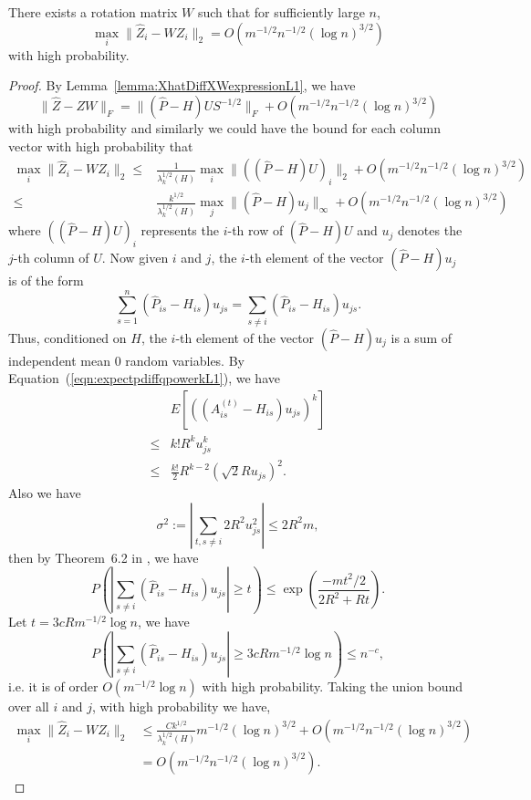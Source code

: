 \begin{theorem}
\label{thm:XhatDiffXWL1}
There exists a rotation matrix $W$ such that for sufficiently large $n$,
\[
	\max_i \| \hat{Z}_i - W Z_i \|_2 = O(m^{-1/2} n^{-1/2} (\log n)^{3/2})
\]
with high probability.
\end{theorem}
\begin{proof}
By Lemma~\ref{lemma:XhatDiffXWexpressionL1}, we have
\[
	\|\hat{Z} - Z W\|_F = \| (\hat{P} - H) U S^{-1/2} \|_F + O(m^{-1/2} n^{-1/2} (\log n)^{3/2})
\]
 with high probability and similarly we could have the bound for each column vector with high probability that
\begin{align*}
	\max_i \| \hat{Z}_i - W Z_i \|_2
    \le & \frac{1}{\lambda_k^{1/2}(H)} \max_i \| ((\hat{P} - H) U)_i \|_2 + O(m^{-1/2} n^{-1/2} (\log n)^{3/2}) \\
    \le & \frac{k^{1/2}}{\lambda_k^{1/2}(H)} \max_j \| (\hat{P} - H) u_j \|_{\infty} + O(m^{-1/2} n^{-1/2} (\log n)^{3/2})
\end{align*}
where $((\hat{P} - H) U)_i$ represents the $i$-th row of $(\hat{P} - H) U$ and $u_j$ denotes the $j$-th column of $U$. Now given $i$ and $j$, the $i$-th element of the vector $(\hat{P} - H) u_j$ is of the form
\[
	\sum_{s=1}^n (\hat{P}_{is} - H_{is}) u_{js} = \sum_{s \ne i} (\hat{P}_{is} - H_{is}) u_{js}.
\]
Thus, conditioned on $H$, the $i$-th element of the vector $(\hat{P} - H) u_j$ is a sum of independent mean 0 random variables.
By Equation~(\ref{eqn:expectpdiffqpowerkL1}), we have
\begin{align*}
	& E\left[\left((A^{(t)}_{is} - H_{is}) u_{js}\right)^k\right] \\ 
    \le & k! R^k u_{js}^k \\
    \le & \frac{k!}{2} R^{k-2} (\sqrt{2} R u_{js})^2.
\end{align*}
Also we have
\[
	\sigma^2 := |\sum_{t, s \ne i} 2 R^2 u_{js}^2| \le 2 R^2 m,
\]
then by Theorem~6.2 in \citep{tropp2012user}, we have
\[
	P \left( \left| \sum_{s \ne i} (\hat{P}_{is} - H_{is}) u_{js} \right| \ge t \right)
    \le \exp \left( \frac{-m t^2/2}{2 R^2 + R t} \right).
\]
Let $t = 3 c R m^{-1/2} \log n$, we have
\[
	P \left( \left| \sum_{s \ne i} (\hat{P}_{is} - H_{is}) u_{js} \right| \ge 3 c R m^{-1/2} \log n \right)
    \le n^{-c},
\]
i.e. it is of order $O(m^{-1/2} \log n)$ with high probability.
Taking the union bound over all $i$ and $j$, with high probability we have,
\begin{align*}
	\max_i \| \hat{Z}_i - W Z_i \|_2
    & \le \frac{C k^{1/2}}{\lambda_k^{1/2}(H)} m^{-1/2} (\log n)^{3/2} + O(m^{-1/2} n^{-1/2} (\log n)^{3/2}) \\
    & = O(m^{-1/2} n^{-1/2} (\log n)^{3/2}).
\end{align*}
\end{proof}


